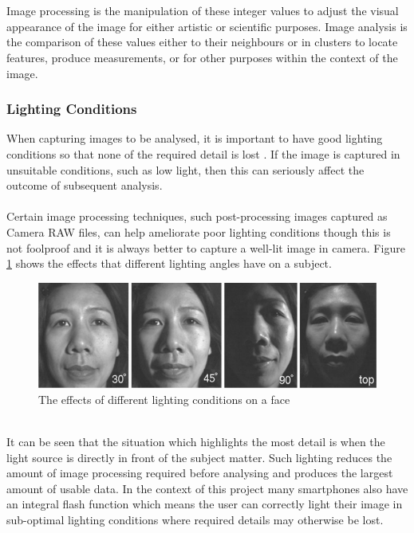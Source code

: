 		\\\\
		Image processing is the manipulation of these integer values to adjust the visual appearance of the image for either artistic or scientific purposes. Image analysis is the comparison of these values either to their neighbours or in clusters to locate features, produce measurements, or for other purposes within the context of the image.
	\subsubsection{Lighting Conditions}
		When capturing images to be analysed, it is important to have good lighting conditions so that none of the required detail is lost \citep{introtoprocessing}. If the image is captured in unsuitable conditions, such as low light, then this can seriously affect the outcome of subsequent analysis. 
		\\\\
		Certain image processing techniques, such post-processing images captured as Camera RAW files, can help ameliorate poor lighting conditions though this is not foolproof and it is always better to capture a well-lit image in camera. Figure \ref{fig:illumination} shows the effects that different lighting angles have on a subject.
		\begin{figure}[h!]
			\centering
			\includegraphics[width=\linewidth]{../images/face_illumination.png}
			\caption[]{The effects of different lighting conditions on a face \citep{introtoprocessing}}
			\label{fig:illumination}
		\end{figure}\\
		It can be seen that the situation which highlights the most detail is when the light source is directly in front of the subject matter. Such lighting reduces the amount of image processing required before analysing and produces the largest amount of usable data. In the context of this project many smartphones also have an integral flash function which means the user can correctly light their image in sub-optimal lighting conditions where required details may otherwise be lost.
